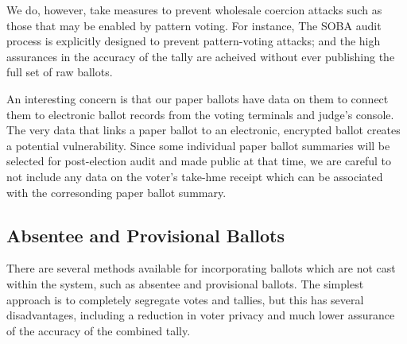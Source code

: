 We do, however, take measures to prevent wholesale coercion attacks such as those that may be enabled by pattern voting.  For instance, The SOBA audit process is explicitly designed to prevent pattern-voting attacks; and the high assurances in the accuracy of the tally are acheived without ever publishing the full set of raw ballots.


An interesting concern is that our paper ballots have data on them to connect them to electronic ballot records from the voting terminals and judge's console. The very data that links a paper ballot to an electronic, encrypted ballot creates a potential vulnerability. Since some individual paper ballot summaries will be selected for post-election audit and made public at that time, we are careful to not include any data on the voter's take-hme receipt which can be associated with the corresonding paper ballot summary.




\subsection{Absentee and Provisional Ballots}
There are several methods available for incorporating ballots which are not cast within the \projname system, such as absentee and provisional ballots.  The simplest approach is to completely segregate votes and tallies, but this has several disadvantages, including a reduction in voter privacy and much lower assurance of the accuracy of the combined tally.

